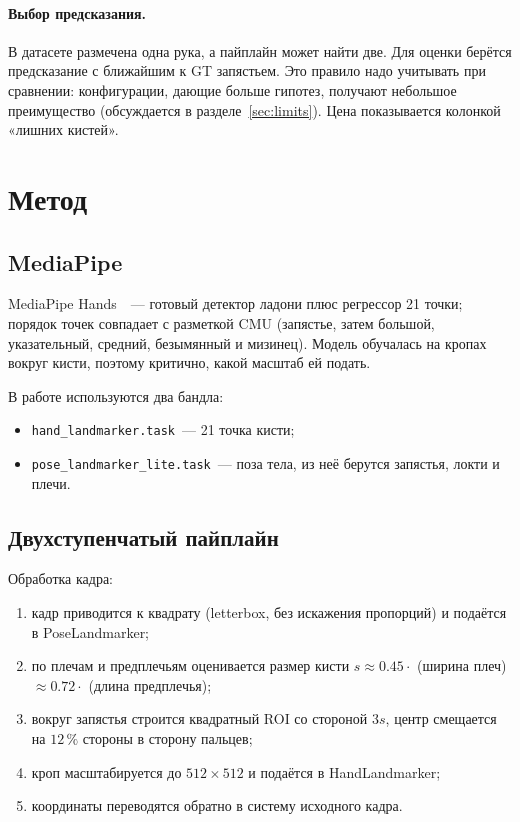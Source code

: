 \documentclass[11pt,a4paper]{article}
\begin{document}
\paragraph{Выбор предсказания.} В датасете размечена одна рука, а пайплайн
может найти две. Для оценки берётся предсказание с ближайшим к GT запястьем.
Это правило надо учитывать при сравнении: конфигурации, дающие больше
гипотез, получают небольшое преимущество (обсуждается в
разделе~\ref{sec:limits}). Цена показывается колонкой «лишних кистей».

\section{Метод}

\subsection{MediaPipe}

MediaPipe Hands~\cite{zhang2020mediapipe}~--- готовый детектор ладони плюс
регрессор 21 точки; порядок точек совпадает с разметкой CMU (запястье, затем
большой, указательный, средний, безымянный и мизинец). Модель обучалась на
кропах вокруг кисти, поэтому критично, какой масштаб ей подать.

В работе используются два бандла:
\begin{itemize}
  \item \texttt{hand\_landmarker.task}~--- 21 точка кисти;
  \item \texttt{pose\_landmarker\_lite.task}~--- поза тела, из неё берутся
        запястья, локти и плечи.
\end{itemize}

\subsection{Двухступенчатый пайплайн}

Обработка кадра:
\begin{enumerate}
  \item кадр приводится к квадрату (letterbox, без искажения пропорций)
        и подаётся в PoseLandmarker;
  \item по плечам и предплечьям оценивается размер кисти
        \(s \approx 0.45\cdot\) (ширина плеч) \(\approx 0.72\cdot\)
        (длина предплечья);
  \item вокруг запястья строится квадратный ROI со стороной
        \(3s\), центр смещается на \(12\,\%\) стороны в сторону пальцев;
  \item кроп масштабируется до \(512\times512\) и подаётся в HandLandmarker;
  \item координаты переводятся обратно в систему исходного кадра.
\end{enumerate}
\end{document}
